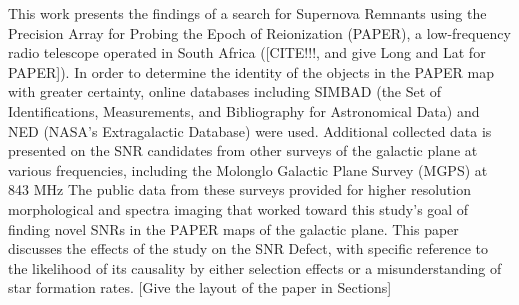 \documentclass[12pt,preprint]{emulateapj}
\begin{document}
This work presents the findings of a search for Supernova Remnants using the Precision Array for Probing the Epoch of Reionization (PAPER), a low-frequency radio telescope operated in South Africa ({\color{red}[CITE!!!, and give Long and Lat for PAPER]}).
In order to determine the identity of the objects in the PAPER map with greater certainty, online databases including SIMBAD (the Set of Identifications, Measurements, and Bibliography for Astronomical Data) and NED (NASA’s Extragalactic Database) were used.  
Additional collected data is presented on the SNR candidates from other surveys of the galactic plane at various frequencies, including the Molonglo Galactic Plane Survey (MGPS) at 843 MHz %
The public data from these surveys provided for higher resolution morphological and spectra imaging that worked toward this study’s goal of finding novel SNRs in the PAPER maps of the galactic plane. %
This paper discusses the effects of the study on the SNR Defect, with specific reference to the likelihood of its causality by either selection effects or a misunderstanding of star formation rates. {\color{red}[Give the layout of the paper in Sections]}

\clearpage

{}
\end{document}

